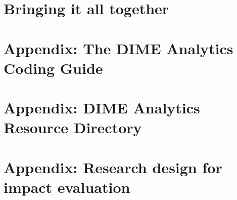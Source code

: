 
\chapter*{Bringing it all together} %




\chapter{Appendix: The DIME Analytics Coding Guide}
\label{ap:1}




\chapter{Appendix: DIME Analytics Resource Directory}
\label{ap:2}





\chapter{Appendix: Research design for impact evaluation}
\label{ap:3}




\backmatter




\printindex %


